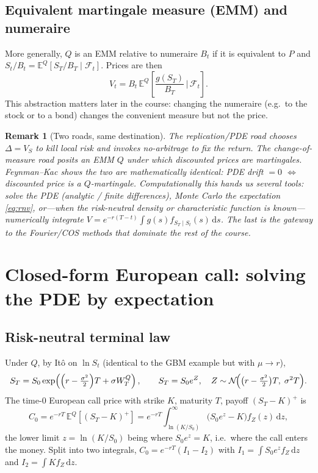 \documentclass[11pt]{article}
\newcommand{\E}{\mathbb{E}}
\newcommand{\dd}{\,\mathrm{d}}
\newtheorem{remark}{Remark}
\begin{document}
\subsection{Equivalent martingale measure (EMM) and numeraire}
More generally, $Q$ is an EMM relative to numeraire $B_t$ if it is equivalent to $P$ and
$S_t/B_t = \E^Q[S_T/B_T\mid\mathcal F_t]$. Prices are then
\begin{equation}
V_t = B_t\,\E^Q\!\left[\frac{g(S_T)}{B_T}\,\Big|\,\mathcal F_t\right].
\end{equation}
This abstraction matters later in the course: changing the numeraire (e.g.\ to the stock or to a bond)
changes the convenient measure but not the price.

\begin{remark}[Two roads, same destination]
The replication/PDE road chooses $\Delta=V_S$ to kill local risk and invokes no-arbitrage to fix the
return. The change-of-measure road posits an EMM $Q$ under which discounted prices are martingales.
Feynman--Kac shows the two are mathematically identical: PDE drift $=0$ $\Leftrightarrow$ discounted
price is a $Q$-martingale. Computationally this hands us several tools: solve the PDE (analytic /
finite differences), Monte Carlo the expectation \eqref{eq:rnv}, or---when the risk-neutral density or
characteristic function is known---numerically integrate
$V = e^{-r(T-t)}\int g(s) f_{S_T\mid S_t}(s)\dd s$. The last is the gateway to the Fourier/COS methods
that dominate the rest of the course.
\end{remark}

\section{Closed-form European call: solving the PDE by expectation}\label{sec:closedform}

\subsection{Risk-neutral terminal law}
Under $Q$, by It\^o on $\ln S_t$ (identical to the GBM example but with $\mu\to r$),
\begin{equation}
S_T = S_0\exp\!\left(\Bigl(r - \tfrac{\sigma^2}{2}\Bigr)T + \sigma W_T^Q\right),
\qquad
S_T = S_0 e^{Z},\quad Z\sim\mathcal N\!\Bigl(\bigl(r-\tfrac{\sigma^2}{2}\bigr)T,\;\sigma^2 T\Bigr).
\end{equation}
The time-0 European call price with strike $K$, maturity $T$, payoff $(S_T-K)^+$ is
\begin{equation}
C_0 = e^{-rT}\,\E^Q\!\left[(S_T-K)^+\right]
= e^{-rT}\int_{\ln(K/S_0)}^{\infty}\bigl(S_0 e^{z} - K\bigr) f_Z(z)\dd z,
\end{equation}
the lower limit $z=\ln(K/S_0)$ being where $S_0 e^z = K$, i.e.\ where the call enters the money. Split
into two integrals, $C_0 = e^{-rT}(I_1 - I_2)$ with $I_1 = \int S_0 e^z f_Z\dd z$ and
$I_2 = \int K f_Z\dd z$.
\end{document}
